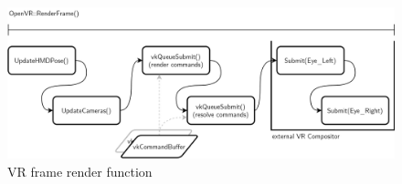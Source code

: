 \begin{figure}[htb]
  \centering
  \includegraphics[width=1.0\textwidth]{pictures/Tachyon_OpenVR_RenderFrame}
  \caption[VR render target's RenderFrame()]{VR frame render function}\label{fig:lst_OpenVR_RenderFrame}
\end{figure} 


